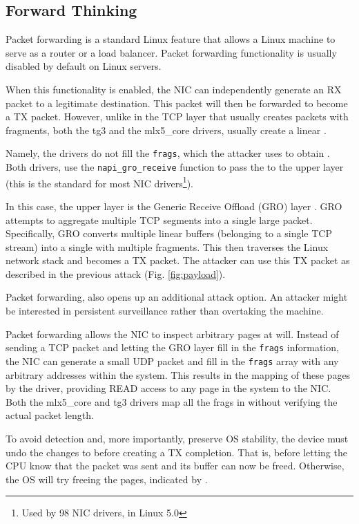 \subsection{Forward Thinking}\label{sec:forward}

Packet forwarding is a standard Linux feature that allows a Linux machine to serve as a router or a load balancer. Packet forwarding functionality is usually disabled by default on Linux servers.

When this functionality is enabled, the NIC can independently generate an RX packet to a legitimate destination. This packet will then be forwarded to become a TX packet. However, unlike in the TCP layer that usually creates \skb{} packets with fragments, both the tg3 and the mlx5\_core drivers, usually create a linear \skb{}.

Namely, the drivers do not fill the \texttt{frags}, which the attacker uses to obtain \means{}. Both drivers, use the \texttt{napi\_gro\_receive} function to pass the \skb{} to the upper layer (this is the standard for most NIC drivers\footnote{Used by 98 NIC drivers, in Linux 5.0}). 

In this case, the upper layer is the Generic Receive Offload (GRO) layer \cite{gro}. GRO attempts to aggregate multiple TCP segments into a single large packet. Specifically, GRO converts multiple linear \skb{} buffers (belonging to a single TCP stream) into a single \skb{} with multiple fragments. This \skb{} then traverses the Linux network stack and becomes a TX packet. The attacker can use this TX packet as described in the previous attack (Fig. \ref{fig:payload}).

Packet forwarding, also opens up an additional attack option. An attacker might be interested in persistent surveillance rather than overtaking the machine. 

Packet forwarding allows the NIC to inspect arbitrary pages at will. 
Instead of sending a TCP packet and letting the GRO layer fill in the \texttt{frags} information, the NIC can generate a small UDP packet and fill in the \texttt{frags} array with any arbitrary \page{} addresses within the system. This results in the mapping of these pages by the driver, providing READ access to any page in the system to the NIC. Both the mlx5\_core and tg3 drivers map all the frags in \shinfo{} without verifying the actual packet length.

To avoid detection and, more importantly, preserve OS stability, the device must undo the changes to \shinfo{} before creating a TX completion. That is, before letting the CPU know that the packet was sent and its buffer can now be freed. Otherwise, the OS will try freeing the pages, indicated by \shinfo.

